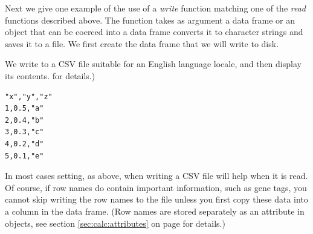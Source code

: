 \documentclass[krantz2]{krantz}\usepackage{knitr}%
\begin{document}
Next we give one example of the use of a \emph{write} function matching one of the \emph{read} functions described above. The  function takes as argument a data frame or an object that can be coerced into a data frame converts it to character strings and saves it to a file. We first create the data frame that we will write to disk.

\begin{knitrout}\footnotesize
{}\color{fgcolor}\begin{kframe}
\begin{alltt}
 \hlkwb{<-} \hlstd{(} \hlstd{=} \hlopt{:}\hlstd{,}  \hlstd{=} \hlopt{:} \hlopt{/} \hlstd{,}  \hlstd{= letters[}\hlopt{:}\hlstd{])}
\end{alltt}
\end{kframe}
\end{knitrout}

We write  to a CSV file suitable for an English language locale, and then display its contents.
\pageref{sec:calc:attributes} for details.)

\begin{knitrout}\footnotesize
{}\color{fgcolor}\begin{kframe}
\begin{alltt}
  \hlstd{=} \hlstd{,}  \hlstd{=} \hlstd{)}
\hlstd{(}\hlstd{,}  \hlstd{=} \hlstd{)}
\end{alltt}
\end{kframe}
\end{knitrout}

\begin{knitrout}\footnotesize
{}\color{fgcolor}\begin{kframe}
\begin{verbatim}
"x","y","z"
1,0.5,"a"
2,0.4,"b"
3,0.3,"c"
4,0.2,"d"
5,0.1,"e"
\end{verbatim}
\end{kframe}
\end{knitrout}

\begin{explainbox}
In most cases setting, as above,  when writing a CSV file will help when it is read. Of course, if row names do contain important information, such as gene tags, you cannot skip writing the row names to the file unless you first copy these data into a column in the data frame. (Row names are stored separately as an attribute in  objects, see section \ref{sec:calc:attributes} on page for details.)
\end{explainbox}
\end{document}
